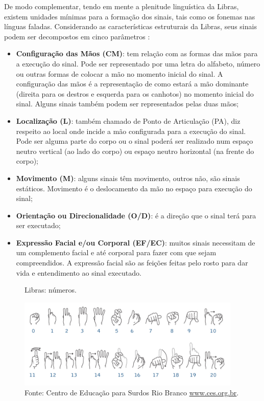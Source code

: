 De modo complementar, tendo em mente a plenitude linguística da Libras, existem unidades mínimas para a formação dos sinais, tais como os fonemas nas línguas faladas. Considerando as características estruturais da Libras, seus sinais podem ser decompostos em cinco parâmetros \cite{Honora2017, Quadros2019}:

\begin{itemize}
    \item \textbf{Configuração das Mãos (CM)}: tem relação com as formas das mãos para a execução do sinal. Pode ser representado por uma letra do alfabeto, número ou outras formas de colocar a mão no momento inicial do sinal. A configuração das mãos é a representação de como estará a mão dominante (direita para os destros e esquerda para os canhotos) no momento inicial do sinal. Alguns sinais também podem ser representados pelas duas mãos;
    \item \textbf{Localização (L)}: também chamado de Ponto de Articulação (PA), diz respeito ao local onde incide a mão configurada para a execução do sinal. Pode ser alguma parte do corpo ou o sinal poderá ser realizado num espaço neutro vertical (ao lado do corpo) ou espaço neutro horizontal (na frente do corpo);
    \item \textbf{Movimento (M)}: alguns sinais têm movimento, outros não, são sinais estáticos. Movimento é o deslocamento da mão no espaço para execução do sinal;
    \item \textbf{Orientação ou Direcionalidade (O/D)}: é a direção que o sinal terá para ser executado;
    \item \textbf{Expressão Facial e/ou Corporal (EF/EC)}: muitos sinais necessitam de um complemento facial e até corporal para fazer com que sejam compreendidos. A expressão facial são as feições feitas pelo rosto para dar vida e entendimento ao sinal executado.
\end{itemize}

\begin{figure}[htbp]
\caption{Libras: números.}
\label{fig:libras-numeros}
\centerline{\includegraphics[width=0.95\textwidth]{images/libras-numeros.jpg}}
\caption*{Fonte: Centro de Educação para Surdos Rio Branco \url{www.ces.org.br}.}
\end{figure}

